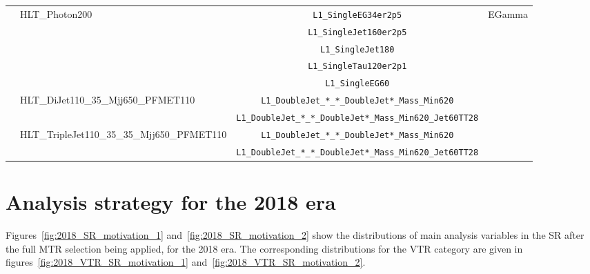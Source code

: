 \begin{table}
\begin{tabular}{l l c c}
                               & \multirow{5}{*}{HLT\_Photon200}                           & \texttt{L1\_SingleEG34er2p5}    & \multirow{5}{*}{EGamma}       \\
                               &                                                           & \texttt{L1\_SingleJet160er2p5}  &                               \\
                               &                                                           & \texttt{L1\_SingleJet180}       &                               \\
                               &                                                           & \texttt{L1\_SingleTau120er2p1}  &                               \\
                               &                                                           & \texttt{L1\_SingleEG60}         &                               \\\cline{2-4}
                               & \multirow{2}{*}{HLT\_DiJet110\_35\_Mjj650\_PFMET110}      & \texttt{L1\_DoubleJet\_*\_*\_DoubleJet*\_Mass\_Min620}       &  \\
                               &                                                      & \texttt{L1\_DoubleJet\_*\_*\_DoubleJet*\_Mass\_Min620\_Jet60TT28} &
                               \\\cline{2-4}
                               & \multirow{2}{*}{HLT\_TripleJet110\_35\_35\_Mjj650\_PFMET110} & \texttt{L1\_DoubleJet\_*\_*\_DoubleJet*\_Mass\_Min620} & \\
                               &                                                             & \texttt{L1\_DoubleJet\_*\_*\_DoubleJet*\_Mass\_Min620\_Jet60TT28} & \\\hline


        \hline\hline %
    \end{tabular}

    \label{a_tab:triggers}

\end{table}

\section{Analysis strategy for the 2018 era}
\label{app:MTR_2018}
\hspace{10pt} Figures~\ref{fig:2018_SR_motivation_1} and~\ref{fig:2018_SR_motivation_2} show the distributions of main analysis variables in the SR after the full MTR selection being applied, for the 2018 era. The corresponding distributions for the VTR category are given in figures~\ref{fig:2018_VTR_SR_motivation_1} and~\ref{fig:2018_VTR_SR_motivation_2}.

